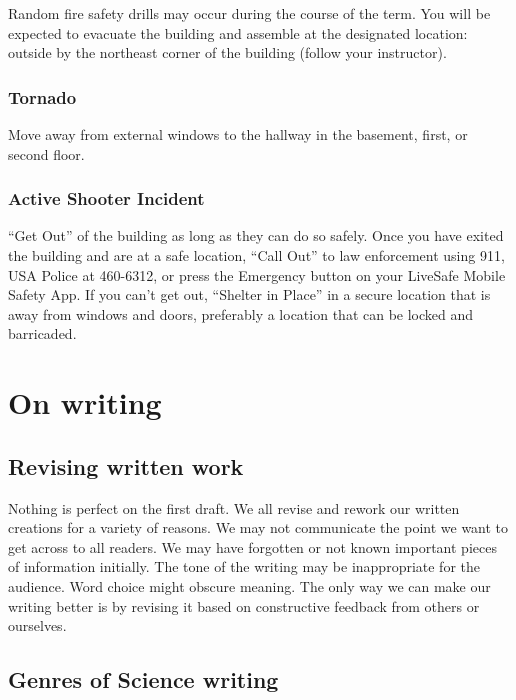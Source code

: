 \documentclass[11pt,]{article}
\begin{document}
Random fire safety drills may occur during the course of the term. You
will be expected to evacuate the building and assemble at the designated
location: outside by the northeast corner of the building (follow your
instructor).

\hypertarget{tornado}{%
\subsubsection{Tornado}\label{tornado}}

Move away from external windows to the hallway in the basement, first,
or second floor.

\hypertarget{active-shooter-incident}{%
\subsubsection{Active Shooter Incident}\label{active-shooter-incident}}

``Get Out'' of the building as long as they can do so safely. Once you
have exited the building and are at a safe location, ``Call Out'' to law
enforcement using 911, USA Police at 460-6312, or press the Emergency
button on your LiveSafe Mobile Safety App. If you can't get out,
``Shelter in Place'' in a secure location that is away from windows and
doors, preferably a location that can be locked and barricaded.

\newpage

\hypertarget{on-writing}{%
\section{On writing}\label{on-writing}}

\hypertarget{revising-written-work}{%
\subsection{Revising written work}\label{revising-written-work}}

Nothing is perfect on the first draft. We all revise and rework our
written creations for a variety of reasons. We may not communicate the
point we want to get across to all readers. We may have forgotten or not
known important pieces of information initially. The tone of the writing
may be inappropriate for the audience. Word choice might obscure
meaning. The only way we can make our writing better is by revising it
based on constructive feedback from others or ourselves.

\hypertarget{genres-of-science-writing}{%
\subsection{Genres of Science writing}\label{genres-of-science-writing}}
\end{document}
